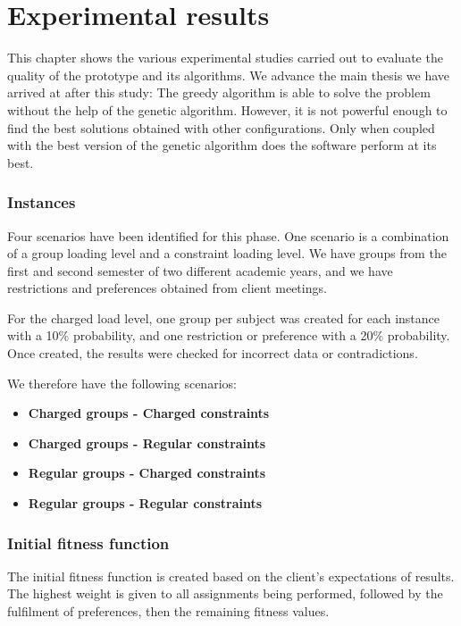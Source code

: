 \renewcommand{\documentname}{Experimental results}

\chapter{Experimental results}\label{experimental-results}

This chapter shows the various experimental studies carried out to evaluate the quality of the prototype and its algorithms. We advance the main thesis we have arrived at after this study: The greedy algorithm is able to solve the problem without the help of the genetic algorithm. However, it is not powerful enough to find the best solutions obtained with other configurations. Only when coupled with the best version of the genetic algorithm does the software perform at its best.


\subsection{Instances}

Four scenarios have been identified for this phase. One scenario is a combination of a group loading level and a constraint loading level. We have groups from the first and second semester of two different academic years, and we have restrictions and preferences obtained from client meetings.

For the charged load level, one group per subject was created for each instance with a 10\% probability, and one restriction or preference with a 20\% probability. Once created, the results were checked for incorrect data or contradictions.

We therefore have the following scenarios:

\begin{itemize}
    \item \textbf{Charged groups - Charged constraints}
    \item \textbf{Charged groups - Regular constraints}
    \item \textbf{Regular groups - Charged constraints}
    \item \textbf{Regular groups - Regular constraints}
\end{itemize}


\subsection{Initial fitness function}

The initial fitness function is created based on the client's expectations of results. The highest weight is given to all assignments being performed, followed by the fulfilment of preferences, then the remaining fitness values.

